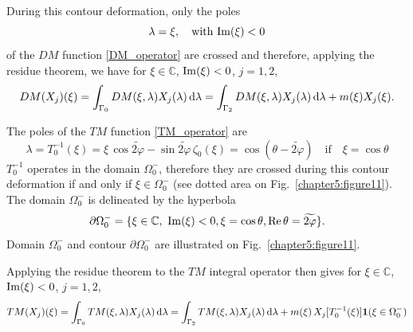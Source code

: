 During this contour deformation, only the poles
\begin{equation}
\lambda = \xi, \quad \text{with } {\rm Im}(\xi) <0 
\end{equation}
of the $DM$ function \eqref{DM_operator} are crossed and therefore, applying the residue theorem, we have for $\xi \in \mathbb{C}$, ${\rm Im}(\xi) <0$, $j=1,2$, 
\begin{equation}
\label{DM_propag_sol}
DM(X_j)(\xi) = \int_{\Gamma_0} DM(\xi,\lambda) X_j(\lambda) \, {\rm d} \lambda  = \int_{\Gamma_2} DM(\xi,\lambda) X_j(\lambda) \, {\rm d} \lambda + m(\xi) X_j(\xi).
\end{equation}

The poles of the $TM$ function \eqref{TM_operator} are
$$ \lambda = T_0^{-1}(\xi) = \xi \, \cos \widetilde{2\varphi}  - \sin \widetilde{2\varphi} \, \zeta_0(\xi) = \cos (\theta - \widetilde{2\varphi}) \quad \text{if} \quad \xi = \cos \theta $$
$T_0^{-1}$ operates in the domain $\Omega_0^-$, therefore they are crossed during this contour deformation if and only if $\xi \in \Omega_0^-$ (see dotted area on Fig.~\ref{chapter5:figure11}).
The domain $\Omega_0^-$ is delineated by the hyperbola 
\begin{equation}
\partial \Omega_0^- = \{   \xi \in \mathbb{C}, \ {\rm Im}(\xi) <0,  \xi = \cos \theta, {\rm Re} \, \theta = \widetilde{2\varphi} \}.
\end{equation}
Domain $\Omega_0^-$ and contour $\partial \Omega_0^-$ are illustrated on Fig.~\ref{chapter5:figure11}.   

Applying the residue theorem to the $TM$ integral operator then gives for $\xi \in \mathbb{C}$, ${\rm Im}(\xi) <0$, $j=1,2$,
\begin{equation}
\label{TM_propag_sol}
TM(X_j)(\xi) = \int_{\Gamma_0} TM(\xi,\lambda) X_j(\lambda) \, {\rm d} \lambda  = \int_{\Gamma_2} TM(\xi,\lambda) X_j(\lambda) \, {\rm d} \lambda + m(\xi) \, X_j[T_0^{-1}(\xi)] \mathbf{1}(\xi \in \Omega_0^-)
\end{equation}

